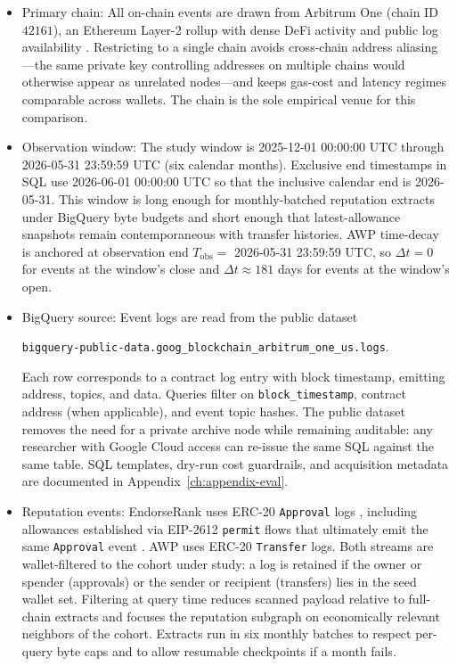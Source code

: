 \begin{itemize}
\item Primary chain: All on-chain events are drawn from Arbitrum One (chain ID $42161$), an Ethereum Layer-2 rollup with dense DeFi activity and public log availability . Restricting to a single chain avoids cross-chain address aliasing---the same private key controlling addresses on multiple chains would otherwise appear as unrelated nodes---and keeps gas-cost and latency regimes comparable across wallets. The chain is the sole empirical venue for this comparison.

\item Observation window: The study window is 2025-12-01 00:00:00 UTC through 2026-05-31 23:59:59 UTC (six calendar months). Exclusive end timestamps in SQL use 2026-06-01 00:00:00 UTC so that the inclusive calendar end is 2026-05-31. This window is long enough for monthly-batched reputation extracts under BigQuery byte budgets and short enough that latest-allowance snapshots remain contemporaneous with transfer histories. AWP time-decay is anchored at observation end $T_{\mathrm{obs}}=$ 2026-05-31 23:59:59 UTC, so $\Delta t=0$ for events at the window's close and $\Delta t\approx 181$ days for events at the window's open.

\item BigQuery source: Event logs are read from the public dataset
\begin{center}
\texttt{bigquery-public-data.goog\_blockchain\_arbitrum\_one\_us.logs}.
\end{center}
Each row corresponds to a contract log entry with block timestamp, emitting address, topics, and data. Queries filter on \texttt{block\_timestamp}, contract address (when applicable), and event topic hashes. The public dataset removes the need for a private archive node while remaining auditable: any researcher with Google Cloud access can re-issue the same SQL against the same table. SQL templates, dry-run cost guardrails, and acquisition metadata are documented in Appendix~\ref{ch:appendix-eval}.

\item Reputation events: EndorseRank uses ERC-20 \texttt{Approval} logs , including allowances established via EIP-2612 \texttt{permit} flows that ultimately emit the same \texttt{Approval} event . AWP uses ERC-20 \texttt{Transfer} logs. Both streams are wallet-filtered to the cohort under study: a log is retained if the owner or spender (approvals) or the sender or recipient (transfers) lies in the seed wallet set. Filtering at query time reduces scanned payload relative to full-chain extracts and focuses the reputation subgraph on economically relevant neighbors of the cohort. Extracts run in six monthly batches to respect per-query byte caps and to allow resumable checkpoints if a month fails.


\end{itemize}

